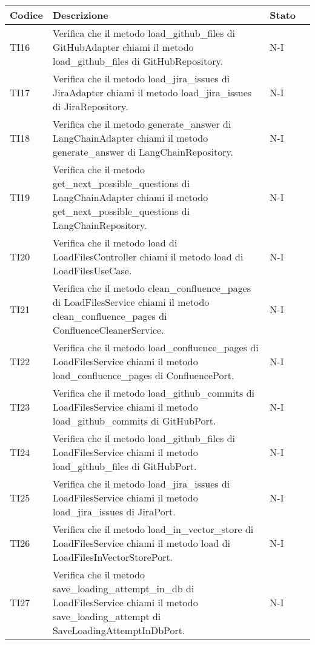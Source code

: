 \begin{table}[h!]
    \centering
    \renewcommand{\arraystretch}{1.5}
    \begin{tabularx}{\textwidth}{|p{}|X|p{}|p{}|}\hline
    \rowcolor[HTML]{FFD700}
    \textbf{Codice} & \textbf{Descrizione} & \textbf{Stato} \\ \hline
    TI16 & Verifica che il metodo load\_github\_files di GitHubAdapter chiami il metodo load\_github\_files di GitHubRepository. &  N-I \\ \hline
    TI17 & Verifica che il metodo load\_jira\_issues di JiraAdapter chiami il metodo load\_jira\_issues di JiraRepository. &  N-I \\ \hline
    TI18 & Verifica che il metodo generate\_answer di LangChainAdapter chiami il metodo generate\_answer di LangChainRepository. &  N-I \\ \hline
    TI19 & Verifica che il metodo get\_next\_possible\_questions di LangChainAdapter chiami il metodo get\_next\_possible\_questions di LangChainRepository. &  N-I \\ \hline
    TI20 & Verifica che il metodo load di LoadFilesController chiami il metodo load di LoadFilesUseCase. &  N-I \\ \hline
    TI21 & Verifica che il metodo clean\_confluence\_pages di LoadFilesService chiami il metodo clean\_confluence\_pages di ConfluenceCleanerService. &  N-I \\ \hline
    TI22 & Verifica che il metodo load\_confluence\_pages di LoadFilesService chiami il metodo load\_confluence\_pages di ConfluencePort. &  N-I \\ \hline
    TI23 & Verifica che il metodo load\_github\_commits di LoadFilesService chiami il metodo load\_github\_commits di GitHubPort. &  N-I \\ \hline
    TI24 & Verifica che il metodo load\_github\_files di LoadFilesService chiami il metodo load\_github\_files di GitHubPort. &  N-I \\ \hline
    TI25 & Verifica che il metodo load\_jira\_issues di LoadFilesService chiami il metodo load\_jira\_issues di JiraPort. &  N-I \\ \hline
    TI26 & Verifica che il metodo load\_in\_vector\_store di LoadFilesService chiami il metodo load di LoadFilesInVectorStorePort. &  N-I \\ \hline
    TI27 & Verifica che il metodo save\_loading\_attempt\_in\_db di LoadFilesService chiami il metodo save\_loading\_attempt di SaveLoadingAttemptInDbPort. &  N-I \\ \hline

\end{tabularx}
\end{table}
